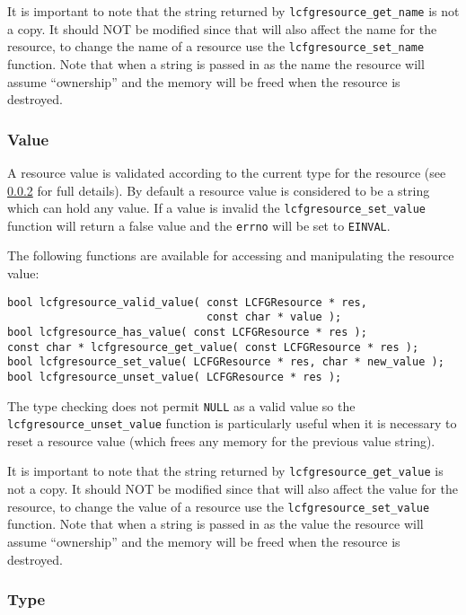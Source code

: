\documentclass[11pt,a4paper,titlepage]{article}
\begin{document}
It is important to note that the string returned by
\texttt{lcfgresource\_get\_name} is not a copy. It should NOT be
modified since that will also affect the name for the resource, to
change the name of a resource use the \texttt{lcfgresource\_set\_name}
function. Note that when a string is passed in as the name the
resource will assume ``ownership'' and the memory will be freed when
the resource is destroyed.

\subsubsection{Value}
\label{subsec:res_value}

A resource value is validated according to the current type for the
resource (see \ref{subsec:res_type} for full details). By default a resource
value is considered to be a string which can hold any value. If a value
is invalid the \texttt{lcfgresource\_set\_value} function will return a
false value and the \texttt{errno} will be set to \texttt{EINVAL}.

The following functions are available for accessing and manipulating
the resource value:

\begin{verbatim}
bool lcfgresource_valid_value( const LCFGResource * res,
                               const char * value );
bool lcfgresource_has_value( const LCFGResource * res );
const char * lcfgresource_get_value( const LCFGResource * res );
bool lcfgresource_set_value( LCFGResource * res, char * new_value );
bool lcfgresource_unset_value( LCFGResource * res );
\end{verbatim}

The type checking does not permit \texttt{NULL} as a valid value so
the \texttt{lcfgresource\_unset\_value} function is particularly useful
when it is necessary to reset a resource value (which frees any memory
for the previous value string).

It is important to note that the string returned by
\texttt{lcfgresource\_get\_value} is not a copy. It should NOT be
modified since that will also affect the value for the resource, to
change the value of a resource use the \texttt{lcfgresource\_set\_value}
function. Note that when a string is passed in as the value the
resource will assume ``ownership'' and the memory will be freed when
the resource is destroyed.

\subsubsection{Type}
\label{subsec:res_type}
\end{document}
